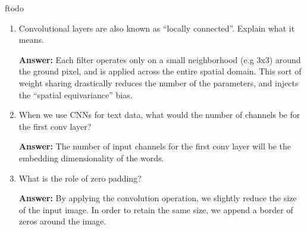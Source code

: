 ƒtodo\documentclass{article}
\newenvironment{QandA}{\begin{enumerate}[label=\arabic*.]}{\end{enumerate}}
\newenvironment{InnerQandA}{\begin{enumerate}[label=\roman*.]}{\end{enumerate}}
\newenvironment{answer}{\par\normalfont \textbf{Answer:}}{}
\begin{document}
\begin{QandA}
\begin{InnerQandA}
        \item How do you choose the ideal filter size?
        \begin{answer}
            First of all, even-sized filters are not typical used because they break the symmetry around the neuron we are computing the local features for. Since 1x1 filters are too noisy and don't capture local dependencies, and 5x5 filters are rather computationally expensive, it has been empirically shown that 3x3 filters combine the best of both worlds: low computation cost and high accuracy.
        \end{answer}
    \end{InnerQandA}

    \item Convolutional layers are also known as ``locally connected''. Explain what it means.
    \begin{answer}
        Each filter operates only on a small neighborhood (e.g 3x3) around the ground pixel, and is applied across the entire spatial domain. This sort of weight sharing drastically reduces the number of the parameters, and injects the ``spatial equivariance'' bias.
    \end{answer}

    \item When we use CNNs for text data, what would the number of channels be for the first conv layer?
    \begin{answer}
        The number of input channels for the first conv layer will be the embedding dimensionality of the words.
    \end{answer}

    \item What is the role of zero padding?
    \begin{answer}
        By applying the convolution operation, we slightly reduce the size of the input image. In order to retain the same size, we append a border of zeros around the image.
    \end{answer}


\end{QandA}
\end{document}
